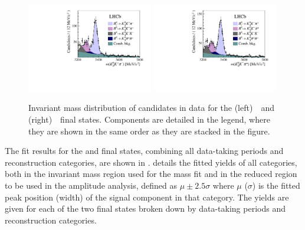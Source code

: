 \begin{figure}[!tb]
\begin{center}
\includegraphics*[width=0.49\textwidth]{figs/fig2a}
\includegraphics*[width=0.49\textwidth]{figs/fig2b}
\end{center}
\caption{\small
  Invariant mass distribution of candidates in data for the
  (left)~\KsKpPim\ and (right)~\KsKmPip\ final states. 
  Components are detailed in the legend, where they are shown in the
  same order as they are stacked in the figure. 
}
\label{fig : mass-fit}
\end{figure}

The fit results for the \KsKpPim and \KsKmPip final states,
combining all data-taking periods and \KS reconstruction categories,
are shown in .
 details the fitted yields of all categories, both in the
invariant mass region used for the mass fit and in the reduced region to be
used in the amplitude analysis, defined as $\mu\pm2.5\sigma$ where $\mu$
($\sigma$) is the fitted peak position (width) of the \Bs signal component in
that category.
The yields are given for each of the two final states broken down by
data-taking periods and \KS reconstruction categories.

